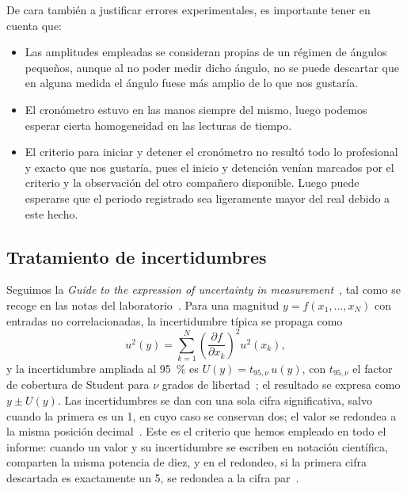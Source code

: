 \documentclass[a4paper,11pt]{amsart}
\numberwithin{equation}{section}
\newcommand{\Tcoef}{t_{95,\nu}}               %
\newcommand{\ext}[1]{U(#1)}                   %
\theoremstyle{cienplano}
\theoremstyle{ciendef}
\theoremstyle{cienobs}
\begin{document}
De cara también a justificar errores experimentales, es importante tener en cuenta que:
\begin{itemize}
    \item Las amplitudes empleadas se consideran propias de un régimen de ángulos pequeños, aunque al no poder medir dicho ángulo, no se puede descartar que en alguna medida el ángulo fuese más amplio de lo que nos gustaría.
    \item El cronómetro estuvo en las manos siempre del mismo, luego podemos esperar cierta homogeneidad en las lecturas de tiempo.
    \item El criterio para iniciar y detener el cronómetro no resultó todo lo profesional y exacto que nos gustaría, pues el inicio y detención venían marcados por el criterio y la observación del otro compañero disponible. Luego puede esperarse que el periodo registrado sea ligeramente mayor del real debido a este hecho.
\end{itemize}

\subsection{Tratamiento de incertidumbres}\label{sec:incertidumbres}
Seguimos la \emph{Guide to the expression of uncertainty in
measurement}~\cite{GUM}, tal como se recoge en las notas del
laboratorio~\cite{NUM-ARG}. Para una magnitud $y=f(x_1,\dots,x_N)$ con
entradas no correlacionadas, la incertidumbre típica se propaga como
\begin{equation}\label{eq:propagacion}
  u^{2}(y)=\sum_{k=1}^{N}\left(\frac{\partial f}{\partial x_k}\right)^{\!2}u^{2}(x_k),
\end{equation}
y la incertidumbre ampliada al \SI{95}{\percent} es $\ext{y}=\Tcoef\,u(y)$,
con $\Tcoef$ el factor de cobertura de Student para $\nu$ grados de
libertad~\cite{NUM-ARG}; el resultado se expresa como $y\pm\ext{y}$. Las
incertidumbres se dan con una sola cifra significativa, salvo cuando la
primera es un 1, en cuyo caso se conservan dos; el valor se redondea a la
misma posición decimal~\cite{ERR-MP}. Este es el criterio que hemos empleado
en todo el informe: cuando un valor y su incertidumbre se escriben en
notación científica, comparten la misma potencia de diez, y en el redondeo,
si la primera cifra descartada es exactamente un 5, se redondea a la cifra
par~\cite{NUM-ARG}.
\end{document}
